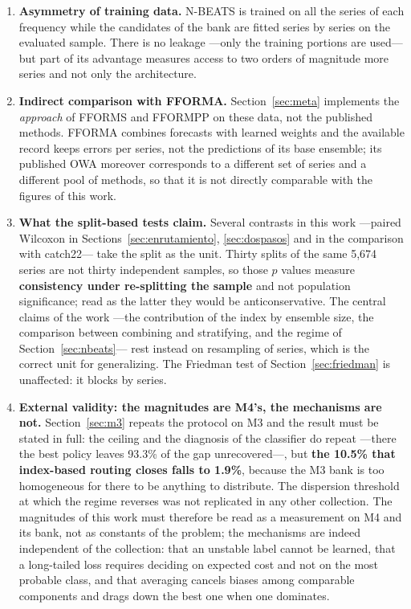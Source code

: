 \begin{enumerate}
\item \textbf{Asymmetry of training data.} N-BEATS is trained on all the series of each
      frequency while the candidates of the bank are fitted series by series on the
      evaluated sample. There is no leakage ---only the training portions are used--- but
      part of its advantage measures access to two orders of magnitude more series and not
      only the architecture.

\item \textbf{Indirect comparison with FFORMA.} Section~\ref{sec:meta} implements the
      \emph{approach} of FFORMS and FFORMPP on these data, not the published methods.
      FFORMA combines forecasts with learned weights and the available record keeps errors
      per series, not the predictions of its base ensemble; its published OWA moreover
      corresponds to a different set of series and a different pool of methods, so that it
      is not directly comparable with the figures of this work.

\item \textbf{What the split-based tests claim.} Several contrasts in this work ---paired
      Wilcoxon in Sections~\ref{sec:enrutamiento}, \ref{sec:dospasos} and in the
      comparison with catch22--- take the split as the unit. Thirty splits of the same
      5{,}674 series are not thirty independent samples, so those $p$ values measure
      \textbf{consistency under re-splitting the sample} and not population significance;
      read as the latter they would be anticonservative. The central claims of the work
      ---the contribution of the index by ensemble size, the comparison between combining
      and stratifying, and the regime of Section~\ref{sec:nbeats}--- rest instead on
      resampling of series, which is the correct unit for generalizing. The Friedman test
      of Section~\ref{sec:friedman} is unaffected: it blocks by series.

\item \textbf{External validity: the magnitudes are M4's, the mechanisms are not.}
      Section~\ref{sec:m3} repeats the protocol on M3 and the result must be stated in
      full: the ceiling and the diagnosis of the classifier do repeat ---there the best
      policy leaves 93.3\% of the gap unrecovered---, but \textbf{the 10.5\% that
      index-based routing closes falls to 1.9\%}, because the M3 bank is too homogeneous
      for there to be anything to distribute. The dispersion threshold at which the regime
      reverses was not replicated in any other collection. The magnitudes of this work
      must therefore be read as a measurement on M4 and its bank, not as constants of the
      problem; the mechanisms are indeed independent of the collection: that an unstable
      label cannot be learned, that a long-tailed loss requires deciding on expected cost
      and not on the most probable class, and that averaging cancels biases among
      comparable components and drags down the best one when one dominates.
\end{enumerate}


